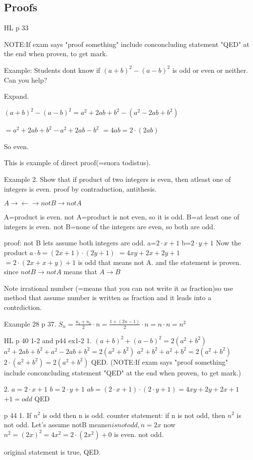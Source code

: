 \subsection{Proofs}

HL p 33

NOTE:If exam says "proof something" include conconcluding statement "QED" at the end when proven, to get mark.


Example: Students dont know if $(a+b)^2-(a-b)^2$ is odd or even or neither. Can you help?

Expand.

$(a+b)^2-(a-b)^2=a^2+2ab+b^2-(a^2-2ab+b^2)$

$=a^2+2ab+b^2-a^2+2ab-b^2$
$=4ab=2\cdot(2ab)$

So even.

This is example of direct proof(=suora todistus).

Example 2.
Show that if product of two integers is even, then atleast one of integers is even.
proof by contraduction, antithesis. 

$A\rightarrow \leftarrow\rightarrow not B\rightarrow notA$

A=product is even.
not A=product is not even, so it is odd.
B=at least one of integers is even.
not B=none of the integers are even, so both are odd.

proof: not B lets assume both integers are odd.
a=$2\cdot x+1$
b=$2\cdot y+1$
Now the product $a\cdot b=(2x+1)\cdot(2y+1)$
$=4xy+2x+2y+1$
$=2\cdot(2x+x+y)+1$
is odd that means not A.
and the statement is proven.
since $not B\rightarrow not A$ means that $A\rightarrow B$

Note irrational number (=means that you can not write it as fraction)so use method that assume number is written as fraction and it leads into a contrdiction.

Example 28 p 37.
$S_n=\frac{u_1+u_n}{2}\cdot n=\frac{1+(2n-1)}{2}\cdot n=n\cdot n=n^2$

HL p 40 1-2 and p44 ex1-2
1. $(a+b)^2+(a-b)^2=2(a^2+b^2)$
$a^2+2ab+b^2+a^2-2ab+b^2=2(a^2+b^2)$
$a^2+b^2+a^2+b^2=2(a^2+b^2)$
$2\cdot(a^2+b^2)=2(a^2+b^2)$
QED. (NOTE:If exam says "proof something" include conconcluding statement "QED" at the end when proven, to get mark.)

2. 
$a=2\cdot x+1$
$b=2\cdot y+1$
$ab=(2\cdot x+1)\cdot(2\cdot y+1)=4xy+2y+2x+1$
$+1=odd$
QED

p 44
1. If $n^2$ is odd then n is odd.
counter statement: if n is not odd, then $n^2$ is not odd.
Let's assume notB means$n is not odd, n=2x$
now $n^2=(2x)^2=4x^2=2\cdot(2x^2)+0$ is even. not odd.

original statement is true, QED.

